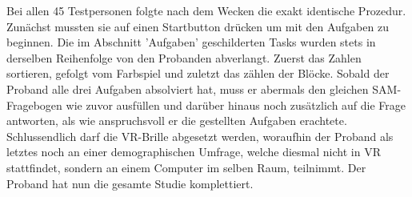 Bei allen 45 Testpersonen folgte nach dem Wecken die exakt identische Prozedur. Zunächst mussten sie auf einen Startbutton drücken um mit den Aufgaben zu beginnen. Die im Abschnitt 'Aufgaben' geschilderten Tasks wurden stets in derselben Reihenfolge von den Probanden abverlangt. Zuerst das Zahlen sortieren, gefolgt vom Farbspiel und zuletzt das zählen der Blöcke. %
Sobald der Proband alle drei Aufgaben absolviert hat, muss er abermals den gleichen SAM-Fragebogen wie zuvor ausfüllen und darüber hinaus noch zusätzlich auf die Frage antworten, als wie anspruchsvoll er die gestellten Aufgaben erachtete.
Schlussendlich darf die VR-Brille abgesetzt werden, woraufhin der Proband als letztes noch an einer demographischen Umfrage, welche diesmal nicht in VR stattfindet, sondern an einem Computer im selben Raum, teilnimmt. Der Proband hat nun die gesamte Studie komplettiert.
